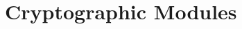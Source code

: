 \section{Cryptographic Modules}\label{sec:cryptographic_modules}
\vspace{7.5cm}



\vspace{-1.5mm}
\newpage

